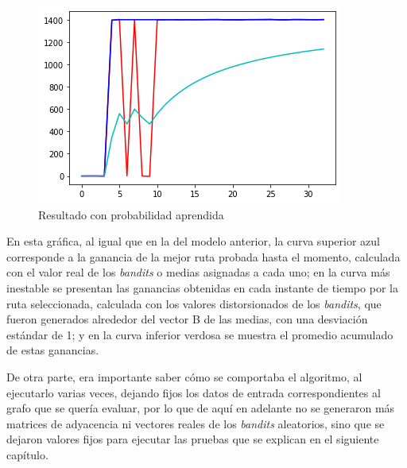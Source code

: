 \begin{figure} [H]
	\centering
	\includegraphics[scale=1]{Resul2}
	\caption{Resultado con probabilidad aprendida}
	\label{Resul2}
\end{figure}

En esta gráfica, al igual que en la del modelo anterior, la curva superior azul corresponde a la ganancia de la mejor ruta probada hasta el momento, calculada con el valor real de los \textit{bandits} o medias asignadas a cada uno; en la curva más inestable se presentan las ganancias obtenidas en cada instante de tiempo por la ruta seleccionada, calculada con los valores distorsionados de los \textit{bandits}, que fueron generados alrededor del vector B de las medias, con una desviación estándar de 1; y en la curva inferior verdosa se muestra el promedio acumulado de estas ganancias. 

De otra parte, era importante saber cómo se comportaba el algoritmo, al ejecutarlo varias veces, dejando fijos los datos de entrada correspondientes al grafo que se quería evaluar, por lo que de aquí en adelante no se generaron más matrices de adyacencia ni vectores reales de los \textit{bandits} aleatorios, sino que se dejaron valores fijos para ejecutar las pruebas que se explican en el siguiente capítulo.


